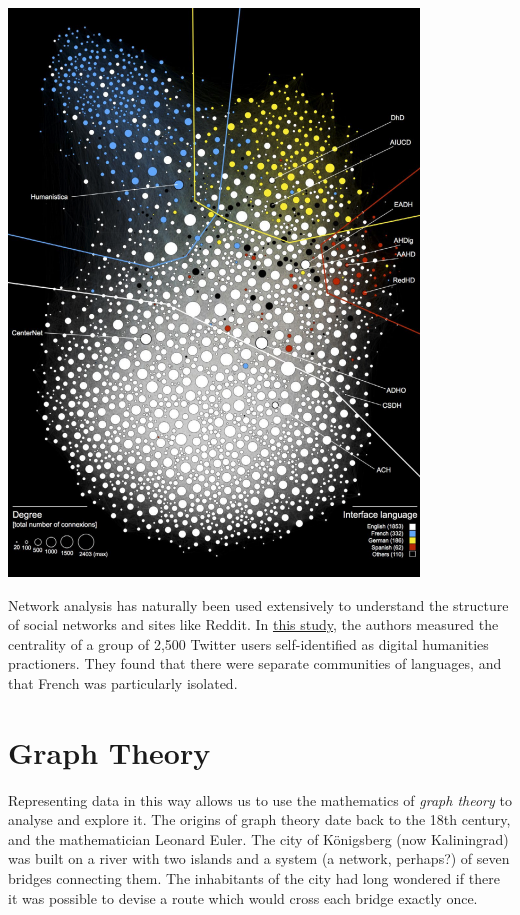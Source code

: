 \documentclass[
]{book}
\begin{document}
\includegraphics{images/Screenshot 2022-10-03 at 11.46.29.png}

Network analysis has naturally been used extensively to understand the structure of social networks and sites like Reddit. In \href{https://halshs.archives-ouvertes.fr/hal-01517493}{this study}, the authors measured the centrality of a group of 2,500 Twitter users self-identified as digital humanities practioners. They found that there were separate communities of languages, and that French was particularly isolated.

\hypertarget{graph-theory}{%
\section{Graph Theory}\label{graph-theory}}

Representing data in this way allows us to use the mathematics of \emph{graph theory} to analyse and explore it. The origins of graph theory date back to the 18th century, and the mathematician Leonard Euler. The city of Königsberg (now Kaliningrad) was built on a river with two islands and a system (a network, perhaps?) of seven bridges connecting them. The inhabitants of the city had long wondered if there it was possible to devise a route which would cross each bridge exactly once.
\end{document}
